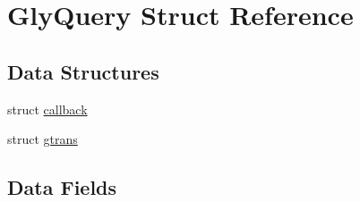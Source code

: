 \hypertarget{structGlyQuery}{
\section{GlyQuery Struct Reference}
\label{structGlyQuery}
}
\subsection*{Data Structures}
\begin{DoxyCompactItemize}
\item 
struct \hyperlink{structGlyQuery_1_1callback}{callback}
\item 
struct \hyperlink{structGlyQuery_1_1gtrans}{gtrans}
\end{DoxyCompactItemize}
\subsection*{Data Fields}
